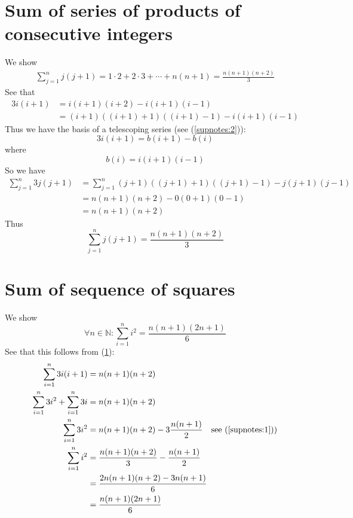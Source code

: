 \documentclass{report}
\begin{document}
\section{Sum of series of products of consecutive integers}
\label{supnotes:3}
We show
\begin{align*}
\boxed{\sum^n_{j=1}j(j+1)=1\cdot2+2\cdot3+\cdots
+n(n+1)=\frac{n(n+1)(n+2)}{3}}
\end{align*}
See that
\begin{align*}
3i(i+1)&=i(i+1)(i+2)-i(i+1)(i-1)\\
&=(i+1)((i+1)+1)((i+1)-1)-i(i+1)(i-1)
\end{align*}
Thus we have the basis of a telescoping series (see (\ref{supnotes:2})):
\begin{equation*}
3i(i+1)=b(i+1)-b(i)
\end{equation*}
where
\begin{equation*}
b(i)=i(i+1)(i-1)
\end{equation*}
So we have
\begin{align*}
\sum^n_{j=1}3j(j+1)&=\sum^n_{j=1}(j+1)((j+1)+1)((j+1)-1)-j(j+1)(j-1)\\
&=n(n+1)(n+2)-0(0+1)(0-1)\\
&=n(n+1)(n+2)
\end{align*}
Thus
\begin{equation*}
\sum^n_{j=1}j(j+1)=\frac{n(n+1)(n+2)}{3}
\end{equation*}
\newpage

\section{Sum of sequence of squares}
\label{supnotes:4}
We show
\begin{equation*}
\boxed{\forall n\in\mathbb{N}:
\sum^n_{i=1}i^2=\frac{n(n+1)(2n+1)}{6}}
\end{equation*}
See that this follows from (\ref{supnotes:3}):
\begin{align*}
\sum^n_{i=1}3i(i+1)&=n(n+1)(n+2)\\
\sum^n_{i=1}3i^2+\sum^n_{i=1}3i&=n(n+1)(n+2)\\
\sum^n_{i=1}3i^2&=n(n+1)(n+2)-3\frac{n(n+1)}{2}\quad\text{see (\ref{supnotes:1}))}\\
\sum^n_{i=1}i^2&=\frac{n(n+1)(n+2)}{3}-\frac{n(n+1)}{2}\\
&=\frac{2n(n+1)(n+2)-3n(n+1)}{6}\\
&=\frac{n(n+1)(2n+1)}{6}
\end{align*}
\end{document}
